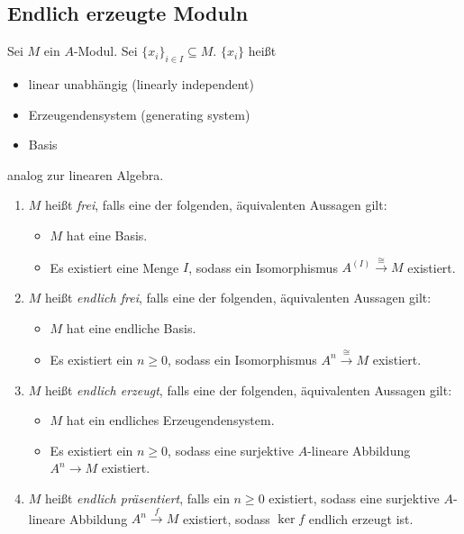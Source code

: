 \documentclass[12pt,a4paper]{scrartcl}
\theoremstyle{cplain}
\theoremstyle{cdef}
\begin{document}
\subsection{Endlich erzeugte Moduln}
\begin{defi}
	Sei $M$ ein $A$-Modul. Sei $\{x_i\}_{i\in I}\subseteq M$. $\{x_i\}$ heißt 
	\begin{itemize}
		\item linear unabhängig (linearly independent)
		\item Erzeugendensystem (generating system)
		\item Basis
	\end{itemize}
	analog zur linearen Algebra.
	\begin{enumerate}
        \item $M$ heißt \emph{frei}, falls eine der folgenden, äquivalenten Aussagen gilt:
        \begin{itemize}
            \item $M$ hat eine Basis.
            \item Es existiert eine Menge $I$, sodass ein Isomorphismus $A^{(I)}\xrightarrow{\cong}M$ existiert.
        \end{itemize}
        \item $M$ heißt \emph{endlich frei}, falls eine der folgenden, äquivalenten Aussagen gilt:
        \begin{itemize}
            \item $M$ hat eine endliche Basis.
            \item Es existiert ein $n \ge 0$, sodass ein Isomorphismus $A^{n}\xrightarrow{\cong}M$ existiert.
        \end{itemize}
        \item $M$ heißt \emph{endlich erzeugt}, falls eine der folgenden, äquivalenten Aussagen gilt:
        \begin{itemize}
            \item $M$ hat ein endliches Erzeugendensystem.
            \item Es existiert ein $n \ge 0$, sodass eine surjektive $A$-lineare Abbildung $A^{n}\to M$ existiert.
        \end{itemize}
        \item $M$ heißt \emph{endlich präsentiert}, falls ein $n \ge 0$ existiert, sodass eine surjektive $A$-lineare Abbildung $A^{n}\xrightarrow{f} M$ existiert, sodass $\ker f$ endlich erzeugt ist.
	\end{enumerate}
\end{defi}
\end{document}
